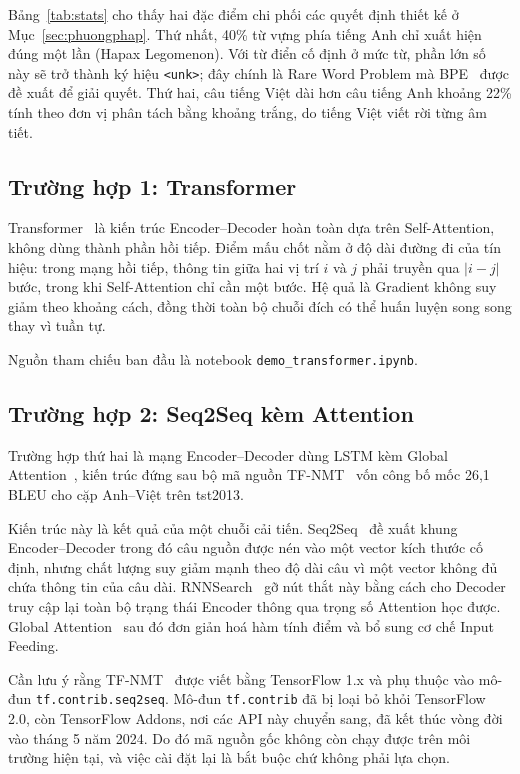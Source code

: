 \documentclass[11pt,a4paper]{article}
\newcommand{\file}[1]{\texttt{\small #1}}
\begin{document}
Bảng~\ref{tab:stats} cho thấy hai đặc điểm chi phối các quyết định thiết kế ở
Mục~\ref{sec:phuongphap}. Thứ nhất, 40\% từ vựng phía tiếng Anh chỉ xuất hiện
đúng một lần (Hapax Legomenon). Với từ điển cố định ở mức từ, phần lớn số này sẽ
trở thành ký hiệu \file{<unk>}; đây chính là Rare Word Problem mà BPE~\cite{sennrich2016}
được đề xuất để giải quyết. Thứ hai, câu tiếng Việt dài hơn câu tiếng Anh khoảng
22\% tính theo đơn vị phân tách bằng khoảng trắng, do tiếng Việt viết rời từng
âm tiết.

\subsection{Trường hợp 1: Transformer}

Transformer~\cite{vaswani2017} là kiến trúc Encoder--Decoder hoàn toàn dựa trên
Self-Attention, không dùng thành phần hồi tiếp. Điểm mấu chốt nằm ở độ dài đường
đi của tín hiệu: trong mạng hồi tiếp, thông tin giữa hai vị trí $i$ và $j$ phải
truyền qua $|i-j|$ bước, trong khi Self-Attention chỉ cần một bước. Hệ quả là
Gradient không suy giảm theo khoảng cách, đồng thời toàn bộ chuỗi đích có thể
huấn luyện song song thay vì tuần tự.

Nguồn tham chiếu ban đầu là notebook \file{demo\_transformer.ipynb}.

\subsection{Trường hợp 2: Seq2Seq kèm Attention}

Trường hợp thứ hai là mạng Encoder--Decoder dùng LSTM kèm Global
Attention~\cite{luong2015emnlp}, kiến trúc đứng sau bộ mã nguồn
TF-NMT~\cite{tfnmt} vốn công bố mốc 26,1 BLEU cho cặp Anh--Việt trên tst2013.

Kiến trúc này là kết quả của một chuỗi cải tiến. Seq2Seq~\cite{sutskever2014}
đề xuất khung Encoder--Decoder trong đó câu nguồn được nén vào một vector kích
thước cố định, nhưng chất lượng suy giảm mạnh theo độ dài câu vì một vector
không đủ chứa thông tin của câu dài. RNNSearch~\cite{bahdanau2015} gỡ nút thắt
này bằng cách cho Decoder truy cập lại toàn bộ trạng thái Encoder thông qua
trọng số Attention học được. Global Attention~\cite{luong2015emnlp} sau đó đơn
giản hoá hàm tính điểm và bổ sung cơ chế Input Feeding.

Cần lưu ý rằng TF-NMT~\cite{tfnmt} được viết bằng TensorFlow 1.x và phụ thuộc
vào mô-đun \file{tf.contrib.seq2seq}. Mô-đun \file{tf.contrib} đã bị loại bỏ
khỏi TensorFlow 2.0, còn TensorFlow Addons, nơi các API này chuyển sang, đã kết
thúc vòng đời vào tháng 5 năm 2024. Do đó mã nguồn gốc không còn chạy được trên
môi trường hiện tại, và việc cài đặt lại là bắt buộc chứ không phải lựa chọn.
\end{document}
